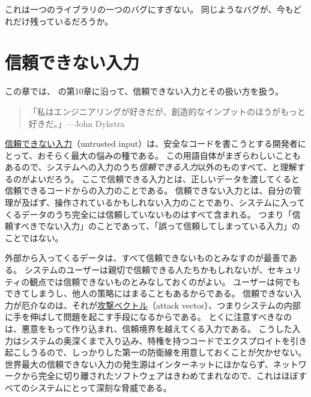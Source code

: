 \documentclass[uplatex]{jsarticle}
\def\label#1{}%
\begin{document}
これは一つのライブラリの一つのバグにすぎない。
同じようなバグが、今もどれだけ残っているだろうか。

\newpage

\section{信頼できない入力}

この章では、\cite{Kohnfelder2021} の第10章に沿って、信頼できない入力とその扱い方を扱う。

\begin{quote}
「私はエンジニアリングが好きだが、創造的なインプットのほうがもっと好きだ。」---John Dykstra
\end{quote}

\begin{dfn}[信頼できない入力]\label{dfn:ch10-untrusted-input}
\underline{信頼できない入力}（untrusted input）は、安全なコードを書こうとする開発者にとって、おそらく最大の悩みの種である。
この用語自体がまぎらわしいこともあるので、システムへの入力のうち\emph{信頼できる入力}以外のものすべて、と理解するのがよいだろう。
ここで信頼できる入力とは、正しいデータを渡してくると信頼できるコードからの入力のことである。
信頼できない入力とは、自分の管理が及ばず、操作されているかもしれない入力のことであり、システムに入ってくるデータのうち完全には信頼していないものはすべて含まれる。
つまり「信頼すべきでない入力」のことであって、「誤って信頼してしまっている入力」のことではない。
\end{dfn}

外部から入ってくるデータは、すべて信頼できないものとみなすのが最善である。
システムのユーザーは親切で信頼できる人たちかもしれないが、セキュリティの観点では信頼できないものとみなしておくのがよい。
ユーザーは何でもできてしまうし、他人の策略にはまることもあるからである。
信頼できない入力が厄介なのは、それが\underline{攻撃ベクトル}（attack vector）、つまりシステムの内部に手を伸ばして問題を起こす手段になるからである。
とくに注意すべきなのは、悪意をもって作り込まれ、信頼境界を越えてくる入力である。
こうした入力はシステムの奥深くまで入り込み、特権を持つコードでエクスプロイトを引き起こしうるので、しっかりした第一の防衛線を用意しておくことが欠かせない。
世界最大の信頼できない入力の発生源はインターネットにほかならず、ネットワークから完全に切り離されたソフトウェアはきわめてまれなので、これはほぼすべてのシステムにとって深刻な脅威である。
\end{document}
